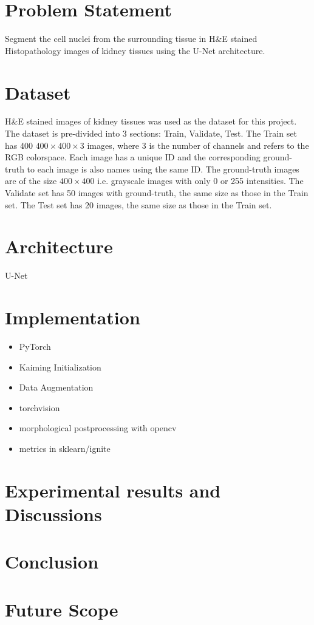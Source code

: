\documentclass[11pt]{article}
\theoremstyle{definition}
\begin{document}
  \newpage
  \section{Problem Statement}
    Segment the cell nuclei from the surrounding tissue in H\&E stained Histopathology images of kidney tissues using the U-Net architecture\cite{Ronneberger2015UNetCN}.

  \section{Dataset}
    H\&E stained images of kidney tissues was used as the dataset for this project.\\
    The dataset is pre-divided into 3 sections: Train, Validate, Test.
    The Train set has 400 $400\times400\times3$ images, where 3 is the number of channels and refers to the RGB colorspace. 
    Each image has a unique ID and the corresponding ground-truth to each image is also names using the same ID. 
    The ground-truth images are of the size $400\times400$ i.e. grayscale images with only 0 or 255 intensities. 
    The Validate set has 50 images with ground-truth, the same size as those in the Train set.
    The Test set has 20 images, the same size as those in the Train set.

  \section{Architecture}
    U-Net\cite{Ronneberger2015UNetCN}

  \section{Implementation}
    \begin{itemize}
      \item PyTorch \cite{paszke2017automatic}
      \item Kaiming Initialization
      \item Data Augmentation
      \item torchvision
      \item morphological postprocessing with opencv
      \item metrics in sklearn/ignite
    \end{itemize}
  \section{Experimental results and Discussions}
  \section{Conclusion}
  \section{Future Scope}
   
  \newpage
  
  
  \medskip
\end{document}
